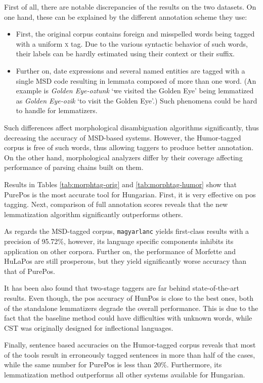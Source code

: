 First of all, there are notable discrepancies of the results on the two datasets. 
On one hand, these can be explained by the different annotation scheme they use:
\begin{itemize}
  \item First, the original corpus contains foreign and misspelled words being tagged with a uniform \textsc{x} tag. Due to the various syntactic behavior of such words, their labels can be hardly estimated using their context or their suffix.
  \item Further on, date expressions and several named entities are tagged with a single MSD code resulting in lemmata composed of more than one word. (An example is \emph{Golden Eye-oztunk} `we visited the Golden Eye’ being lemmatized as \emph{Golden Eye-ozik} `to visit the Golden Eye’.) 
  Such phenomena could be hard to handle for lemmatizers.
\end{itemize}
Such differences affect morphological disambiguation algorithms significantly, thus decreasing the accuracy of MSD-based systems.
However, the Humor-tagged corpus is free of such words, thus allowing taggers to produce better annotation. 
On the other hand, morphological analyzers differ by their coverage affecting performance of parsing chains built on them.

Results in Tables \ref{tab:morphtag-orig} and \ref{tab:morphtag-humor} show that PurePos is the most accurate tool for Hungarian. 
First, it is very effective on \gls{pos} tagging. %
Next, comparison of full annotation scores reveals that the new lemmatization algorithm significantly outperforms others. 

As regards the MSD-tagged corpus, \texttt{magyarlanc} yields first-class results with a precision of 95.72\%, however, its language specific components inhibits its application on other corpora. 
Further on, the performance of Morfette and HuLaPos are still prosperous, but they yield significantly worse accuracy than that of PurePos.  

It has been also found that two-stage taggers are far behind state-of-the-art results. 
Even though, the \gls{pos} accuracy of HunPos is close to the best ones, both of the standalone lemmatizers degrade the overall performance. 
This is due to the fact that the baseline method could have difficulties with unknown words, while CST was originally designed for inflectional languages. 

Finally, sentence based accuracies on the Humor-tagged corpus reveals that most of the tools result in erroneously tagged sentences in more than half of the cases, while the same number for PurePos is less than 20\%. Furthermore, its lemmatization method outperforms all other systems available for Hungarian.



